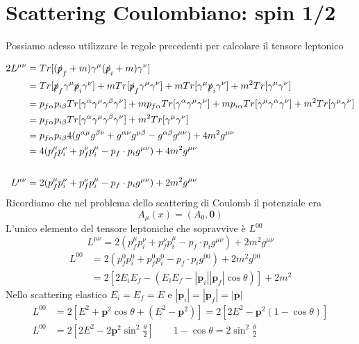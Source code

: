 \section{Scattering Coulombiano: spin 1/2}
Possiamo adesso utilizzare le regole precedenti per calcolare il tensore leptonico

\begin{align*}
2L^{\mu\nu} &= Tr[(\slashed{p}_f + m)\gamma^\mu (\slashed{p}_i + m)\gamma^\nu] \\
&= Tr[\slashed{p}_f \gamma^\mu \slashed{p}_i \gamma^\nu] + mTr[\slashed{p}_f \gamma^\mu \gamma^\nu] + mTr[\gamma^\mu \slashed{p}_i \gamma^\nu] + m^2Tr[\gamma^\mu \gamma^\nu] \\
&= p_{f\alpha}p_{i\beta}Tr[\gamma^\alpha\gamma^\mu\gamma^\beta\gamma^\nu] + mp_{f\alpha}Tr[\gamma^\alpha\gamma^\mu\gamma^\nu] + mp_{i\alpha}Tr[\gamma^\mu\gamma^\alpha\gamma^\nu] + m^2Tr[\gamma^\mu\gamma^\nu] \\
&= p_{f\alpha}p_{i\beta}Tr[\gamma^\alpha\gamma^\mu\gamma^\beta\gamma^\nu] + m^2Tr[\gamma^\mu\gamma^\nu] \\
&= p_{f\alpha}p_{i\beta} 4(g^{\alpha\mu}g^{\beta\nu} + g^{\alpha\nu}g^{\mu\beta} - g^{\alpha\beta}g^{\mu\nu}) + 4m^2g^{\mu\nu} \\
&= 4(p_f^\mu p_i^\nu + p_f^\nu p_i^\mu - p_f \cdot p_i g^{\mu\nu}) + 4m^2g^{\mu\nu} \\
\\
L^{\mu\nu} &= 2(p_f^\mu p_i^\nu + p_f^\nu p_i^\mu - p_f \cdot p_i g^{\mu\nu}) + 2m^2g^{\mu\nu}
\end{align*}
Ricordiamo che nel problema dello scattering di Coulomb il potenziale era
$$
A_\mu(x) = (A_0, \mathbf{0})
$$
L'unico elemento del tensore leptoniche che sopravvive è $L^{00}$
$$
L^{\mu\nu} = 2(p_f^\mu p_i^\nu + p_f^\nu p_i^\mu - p_f \cdot p_i g^{\mu\nu}) + 2m^2 g^{\mu\nu}
$$
\begin{align*}
    L^{00} &= 2(p_f^0 p_i^0 + p_f^0 p_i^0 - p_f \cdot p_i g^{00}) + 2m^2 g^{00}\\
    &= 2[2E_i E_f - (E_i E_f - |\mathbf{p}_i| |\mathbf{p}_f| \cos\theta)] + 2m^2
\end{align*}
Nello scattering elastico $E_i=E_f=E$ e $|\mathbf{p}_i|=|\mathbf{p}_f|=|\mathbf{p}|$
\begin{align*}
    L^{00} &= 2[E^2 + \mathbf{p}^2 \cos\theta + (E^2 - \mathbf{p}^2)] = 2[2E^2 - \mathbf{p}^2(1 - \cos\theta)]\\
    L^{00} &= 2[2E^2 - 2\mathbf{p}^2 \sin^2 \frac{\theta}{2}] \qquad 1 - \cos\theta = 2\sin^2 \frac{\theta}{2}
\end{align*}
